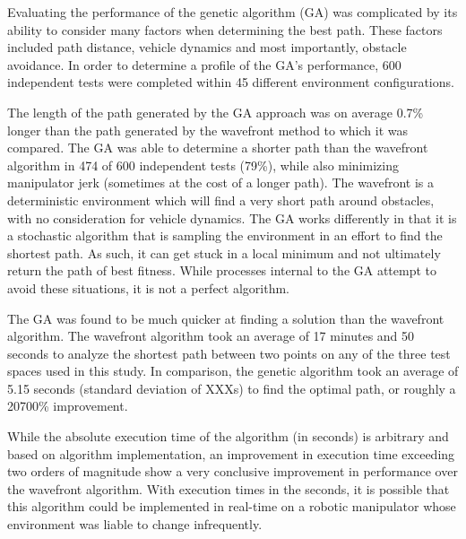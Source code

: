 %
Evaluating the performance of the genetic algorithm (GA) was complicated by its ability to consider many factors when determining the best path. These factors included path distance, vehicle dynamics and most importantly, obstacle avoidance. In order to determine a profile of the GA's performance, 600 independent tests were completed within 45 different environment configurations.

The length of the path generated by the GA approach was on average 0.7\% longer than the path generated by the wavefront method to which it was compared. The GA was able to determine a shorter path than the wavefront algorithm in 474 of 600 independent tests (79\%), while also minimizing manipulator jerk (sometimes at the cost of a longer path). The wavefront is a deterministic environment which will find a very short path around obstacles, with no consideration for vehicle dynamics. The GA works differently in that it is a stochastic algorithm that is sampling the environment in an effort to find the shortest path. As such, it can get stuck in a local minimum and not ultimately return the path of best fitness. While processes internal to the GA attempt to avoid these situations, it is not a perfect algorithm.

The GA was found to be much quicker at finding a solution than the wavefront algorithm. The wavefront algorithm took an average of 17 minutes and 50 seconds to analyze the shortest path between two points on any of the three test spaces used in this study. In comparison, the genetic algorithm took an average of 5.15 seconds (standard deviation of XXXs) to find the optimal path, or roughly a 20700\% improvement.

While the absolute execution time of the algorithm (in seconds) is arbitrary and based on algorithm implementation, an improvement in execution time exceeding two orders of magnitude show a very conclusive improvement in performance over the wavefront algorithm. With execution times in the seconds, it is possible that this algorithm could be implemented in real-time on a robotic manipulator whose environment was liable to change infrequently.

